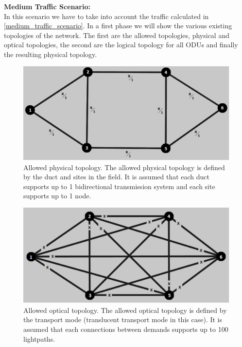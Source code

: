 \noindent
\textbf{Medium Traffic Scenario:}\\

In this scenario we have to take into account the traffic calculated in \ref{medium_traffic_scenario}. In a first phase we will show the various existing topologies of the network. The first are the allowed topologies, physical and optical topologies, the second are the logical topology for all ODUs and finally the resulting physical topology.\\

\begin{figure}[H]
\centering
\includegraphics[width=13cm]{sdf/heuristic/translucent_survivability/figures/allowed_physical}
\caption{Allowed physical topology. The allowed physical topology is defined by the duct and sites in the field. It is assumed that each duct supports up to 1 bidirectional transmission system and each site supports up to 1 node.}
\label{allowed_physical_surv_ref_medium_heuristic_translucent}
\end{figure}

\begin{figure}[H]
\centering
\includegraphics[width=13cm]{sdf/heuristic/translucent_survivability/figures/allowed_optical}
\caption{Allowed optical topology. The allowed optical topology is defined by the transport mode (translucent transport mode in this case). It is assumed that each connections between demands supports up to 100 lightpaths.}
\label{allowed_optical_surv_ref_medium_heuristic_translucent}
\end{figure}

